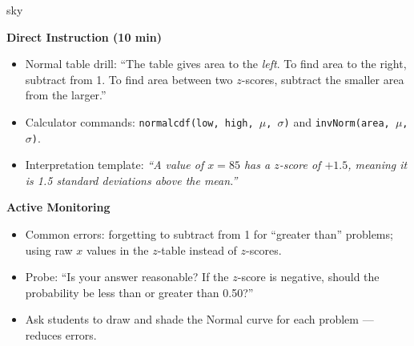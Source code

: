 \documentclass[10pt]{article}
\begin{document}
\begin{skillbox}{sky}
\begin{minipage}[t]{0.48\linewidth}
    \textbf{Direct Instruction (10 min)}
    \begin{itemize}
        \item Normal table drill: ``The table gives area to the \textit{left}. To find area to the right, subtract from 1. To find area between two $z$-scores, subtract the smaller area from the larger.''
        \item Calculator commands: \texttt{normalcdf(low, high, $\mu$, $\sigma$)} and \texttt{invNorm(area, $\mu$, $\sigma$)}.
        \item Interpretation template: \textit{``A value of $x = 85$ has a $z$-score of $+1.5$, meaning it is 1.5 standard deviations above the mean.''}
    \end{itemize}
\end{minipage}
\hfill
\begin{minipage}[t]{0.48\linewidth}
    \textbf{Active Monitoring}
    \begin{itemize}
        \item Common errors: forgetting to subtract from 1 for ``greater than'' problems; using raw $x$ values in the $z$-table instead of $z$-scores.
        \item Probe: ``Is your answer reasonable? If the $z$-score is negative, should the probability be less than or greater than 0.50?''
        \item Ask students to draw and shade the Normal curve for each problem --- reduces errors.
    \end{itemize}
\end{minipage}
\end{skillbox}
\end{document}
